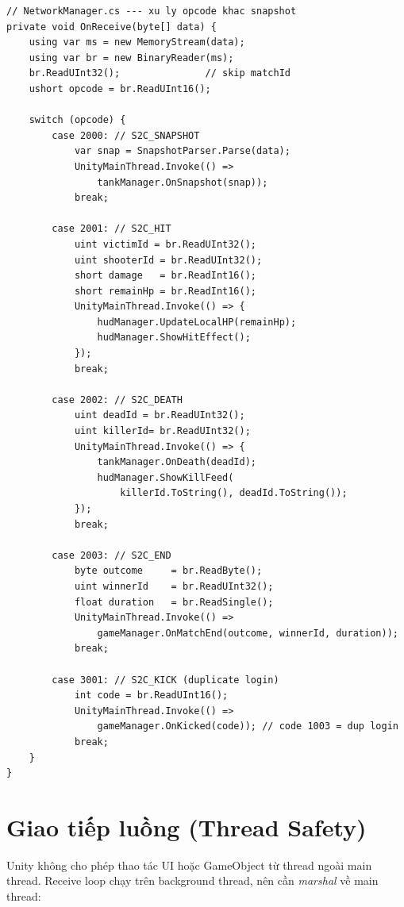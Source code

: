 \documentclass[12pt,a4paper]{report}
\begin{document}
\begin{lstlisting}[style=bashStyle, caption={Xử lý các gói S2C đặc biệt}, label={lst:s2cspecial}]
// NetworkManager.cs --- xu ly opcode khac snapshot
private void OnReceive(byte[] data) {
    using var ms = new MemoryStream(data);
    using var br = new BinaryReader(ms);
    br.ReadUInt32();               // skip matchId
    ushort opcode = br.ReadUInt16();

    switch (opcode) {
        case 2000: // S2C_SNAPSHOT
            var snap = SnapshotParser.Parse(data);
            UnityMainThread.Invoke(() =>
                tankManager.OnSnapshot(snap));
            break;

        case 2001: // S2C_HIT
            uint victimId = br.ReadUInt32();
            uint shooterId = br.ReadUInt32();
            short damage   = br.ReadInt16();
            short remainHp = br.ReadInt16();
            UnityMainThread.Invoke(() => {
                hudManager.UpdateLocalHP(remainHp);
                hudManager.ShowHitEffect();
            });
            break;

        case 2002: // S2C_DEATH
            uint deadId = br.ReadUInt32();
            uint killerId= br.ReadUInt32();
            UnityMainThread.Invoke(() => {
                tankManager.OnDeath(deadId);
                hudManager.ShowKillFeed(
                    killerId.ToString(), deadId.ToString());
            });
            break;

        case 2003: // S2C_END
            byte outcome     = br.ReadByte();
            uint winnerId    = br.ReadUInt32();
            float duration   = br.ReadSingle();
            UnityMainThread.Invoke(() =>
                gameManager.OnMatchEnd(outcome, winnerId, duration));
            break;

        case 3001: // S2C_KICK (duplicate login)
            int code = br.ReadUInt16();
            UnityMainThread.Invoke(() =>
                gameManager.OnKicked(code)); // code 1003 = dup login
            break;
    }
}
\end{lstlisting}

\section{Giao tiếp luồng (Thread Safety)}

Unity không cho phép thao tác UI hoặc GameObject từ thread ngoài main thread. Receive loop chạy trên background thread, nên cần \textit{marshal} về main thread:
\end{document}
